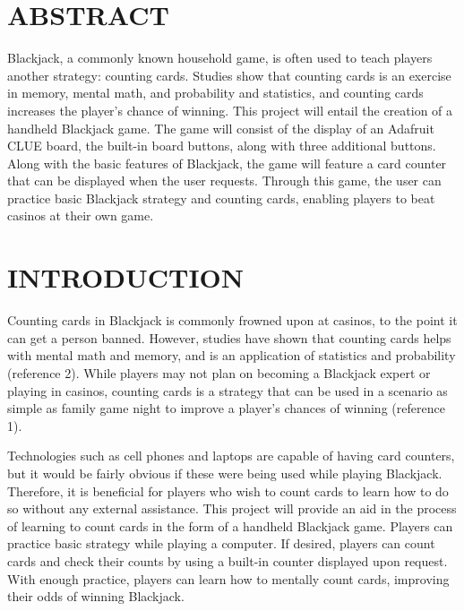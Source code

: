 \documentclass[12pt]{article}
\begin{document}
\section{ABSTRACT}

Blackjack, a commonly known household game, is often used to teach players another strategy: counting cards. Studies show that counting cards is an exercise in memory, mental math, and probability and statistics, and counting cards increases the player’s chance of winning. This project will entail the creation of a handheld Blackjack game. The game will consist of the display of an Adafruit CLUE board, the built-in board buttons, along with three additional buttons. Along with the basic features of Blackjack, the game will feature a card counter that can be displayed when the user requests. Through this game, the user can practice basic Blackjack strategy and counting cards, enabling players to beat casinos at their own game.

\section{INTRODUCTION}

Counting cards in Blackjack is commonly frowned upon at casinos, to the point it can get a person banned. However, studies have shown that counting cards helps with mental math and memory, and is an application of statistics and probability (reference 2). While players may not plan on becoming a Blackjack expert or playing in casinos, counting cards is a strategy that can be used in a scenario as simple as family game night to improve a player’s chances of winning (reference 1). 

Technologies such as cell phones and laptops are capable of having card counters, but it would be fairly obvious if these were being used while playing Blackjack. Therefore, it is beneficial for players who wish to count cards to learn how to do so without any external assistance. This project will provide an aid in the process of learning to count cards in the form of a handheld Blackjack game. Players can practice basic strategy while playing a computer. If desired, players can count cards and check their counts by using a built-in counter displayed upon request. With enough practice, players can learn how to mentally count cards, improving their odds of winning Blackjack.
\end{document}
